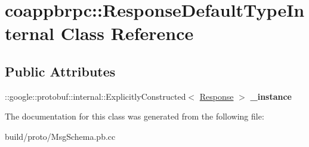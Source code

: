 \hypertarget{classcoappbrpc_1_1ResponseDefaultTypeInternal}{}\section{coappbrpc\+:\+:Response\+Default\+Type\+Internal Class Reference}
\label{classcoappbrpc_1_1ResponseDefaultTypeInternal}
\subsection*{Public Attributes}
\begin{DoxyCompactItemize}
\item 
\mbox{\label{classcoappbrpc_1_1ResponseDefaultTypeInternal_a2682abc1502e4594ce2ef83ca88e219d}} 
\+::google\+::protobuf\+::internal\+::\+Explicitly\+Constructed$<$ \hyperlink{classcoappbrpc_1_1Response}{Response} $>$ {\bfseries \+\_\+instance}
\end{DoxyCompactItemize}


The documentation for this class was generated from the following file\+:\begin{DoxyCompactItemize}
\item 
build/proto/Msg\+Schema.\+pb.\+cc\end{DoxyCompactItemize}
